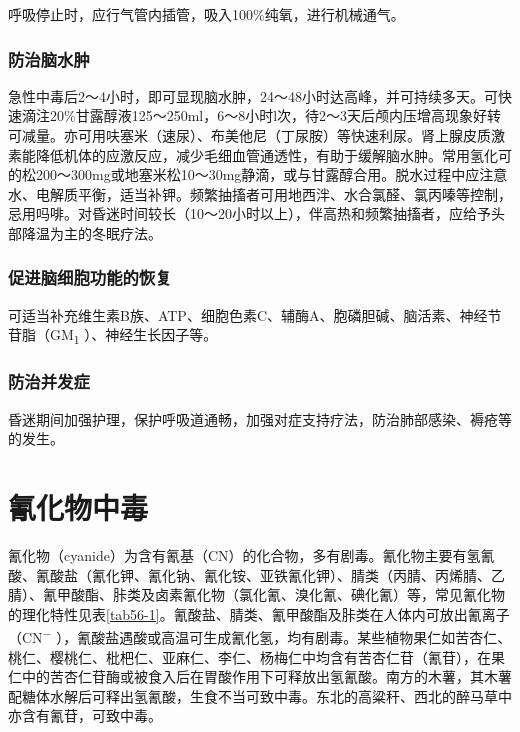 呼吸停止时，应行气管内插管，吸入100\%纯氧，进行机械通气。

\subsubsection{防治脑水肿}

急性中毒后2～4小时，即可显现脑水肿，24～48小时达高峰，并可持续多天。可快速滴注20\%甘露醇液125～250ml，6～8小时l次，待2～3天后颅内压增高现象好转可减量。亦可用呋塞米（速尿）、布美他尼（丁尿胺）等快速利尿。肾上腺皮质激素能降低机体的应激反应，减少毛细血管通透性，有助于缓解脑水肿。常用氢化可的松200～300mg或地塞米松10～30mg静滴，或与甘露醇合用。脱水过程中应注意水、电解质平衡，适当补钾。频繁抽搐者可用地西泮、水合氯醛、氯丙嗪等控制，忌用吗啡。对昏迷时间较长（10～20小时以上），伴高热和频繁抽搐者，应给予头部降温为主的冬眠疗法。

\subsubsection{促进脑细胞功能的恢复}

可适当补充维生素B族、ATP、细胞色素C、辅酶A、胞磷胆碱、脑活素、神经节苷脂（GM\textsubscript{1}
）、神经生长因子等。

\subsubsection{防治并发症}

昏迷期间加强护理，保护呼吸道通畅，加强对症支持疗法，防治肺部感染、褥疮等的发生。

\protect\hypertarget{text00148.html}{}{}

\section{氰化物中毒}

氰化物（cyanide）为含有氰基（CN）的化合物，多有剧毒。氰化物主要有氢氰酸、氰酸盐（氰化钾、氰化钠、氰化铵、亚铁氰化钾）、腈类（丙腈、丙烯腈、乙腈）、氰甲酸酯、胩类及卤素氰化物（氯化氰、溴化氰、碘化氰）等，常见氰化物的理化特性见表\ref{tab56-1}。氰酸盐、腈类、氰甲酸酯及胩类在人体内可放出氰离子（CN\textsuperscript{−}
），氰酸盐遇酸或高温可生成氰化氢，均有剧毒。某些植物果仁如苦杏仁、桃仁、樱桃仁、枇杷仁、亚麻仁、李仁、杨梅仁中均含有苦杏仁苷（氰苷），在果仁中的苦杏仁苷酶或被食入后在胃酸作用下可释放出氢氰酸。南方的木薯，其木薯配糖体水解后可释出氢氰酸，生食不当可致中毒。东北的高粱秆、西北的醉马草中亦含有氰苷，可致中毒。

